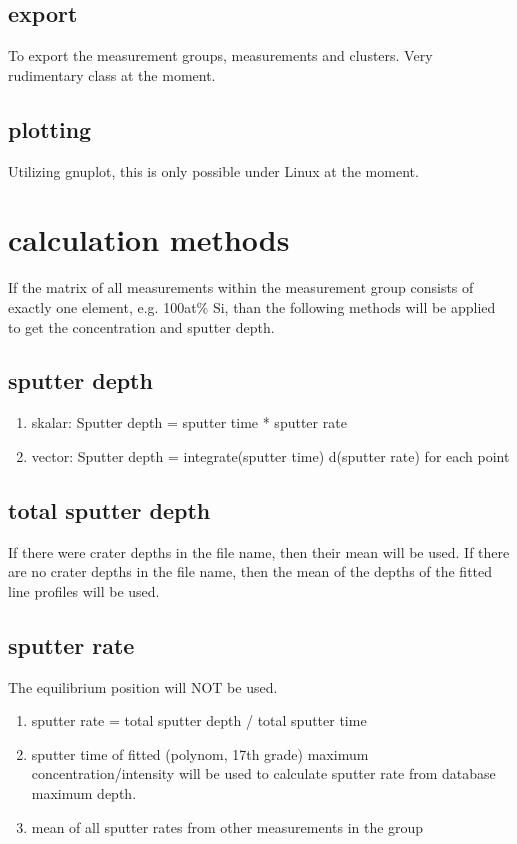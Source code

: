 \documentclass[a4paper,10pt]{article}
\begin{document}
\subsection{export}
To export the measurement groups, measurements and clusters. Very rudimentary class at the moment.

\subsection{plotting}
Utilizing gnuplot, this is only possible under Linux at the moment.

\section{calculation methods}
If the matrix of all measurements within the measurement group consists of exactly one element, e.g. 100at\% Si, than the following methods will be applied to get the concentration and sputter depth.

\subsection{sputter depth}
\begin{enumerate}
 \item skalar: Sputter depth = sputter time * sputter rate 
 \item vector: Sputter depth = integrate(sputter time) d(sputter rate) for each point
\end{enumerate}

\subsection{total sputter depth}
If there were crater depths in the file name, then their mean will be used. 
If there are no crater depths in the file name, then the mean of the depths of the fitted line profiles will be used.

\subsection{sputter rate}
The equilibrium position will NOT be used.
\begin{enumerate}
 \item sputter rate =  total sputter depth / total sputter time 
 \item sputter time of fitted (polynom, 17th grade) maximum concentration/intensity will be used to calculate sputter rate from database maximum depth.
 \item mean of all sputter rates from other measurements in the group
\end{enumerate}
\end{document}
